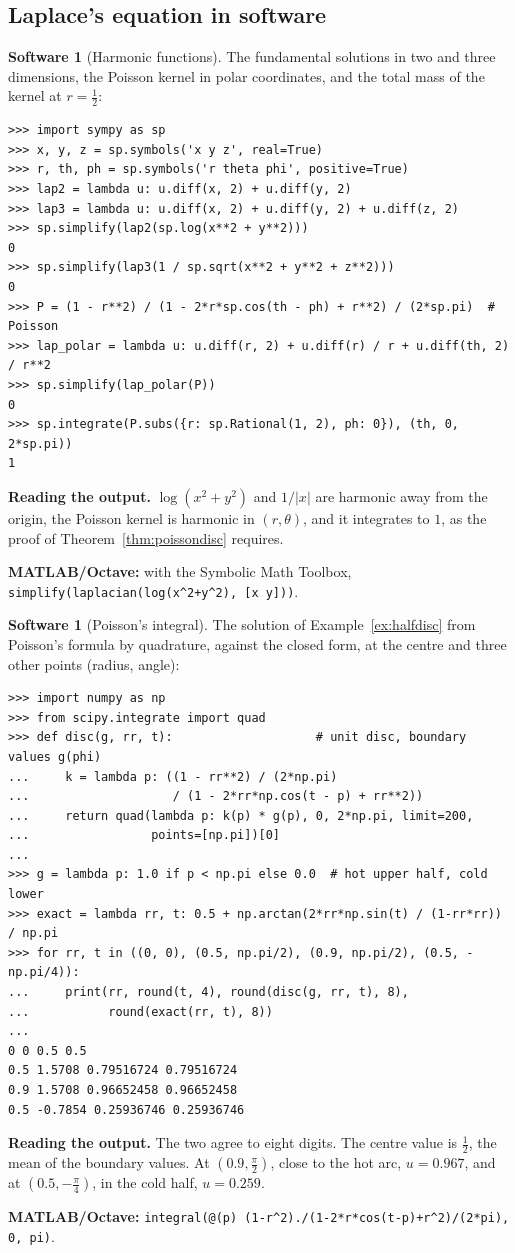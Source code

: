 \documentclass[11pt,a4paper]{article}
\numberwithin{equation}{section}
\theoremstyle{definition}
\newtheorem{software}[thm]{Software}
\begin{document}
\subsection{Laplace's equation in software}
\label{ssec:software8}

\begin{software}[Harmonic functions]
\label{sw:harmonic}
The fundamental solutions in two and three dimensions, the Poisson kernel in polar coordinates, and the total mass of the kernel at $r = \frac12$:
{\small\begin{verbatim}
>>> import sympy as sp
>>> x, y, z = sp.symbols('x y z', real=True)
>>> r, th, ph = sp.symbols('r theta phi', positive=True)
>>> lap2 = lambda u: u.diff(x, 2) + u.diff(y, 2)
>>> lap3 = lambda u: u.diff(x, 2) + u.diff(y, 2) + u.diff(z, 2)
>>> sp.simplify(lap2(sp.log(x**2 + y**2)))
0
>>> sp.simplify(lap3(1 / sp.sqrt(x**2 + y**2 + z**2)))
0
>>> P = (1 - r**2) / (1 - 2*r*sp.cos(th - ph) + r**2) / (2*sp.pi)  # Poisson
>>> lap_polar = lambda u: u.diff(r, 2) + u.diff(r) / r + u.diff(th, 2) / r**2
>>> sp.simplify(lap_polar(P))
0
>>> sp.integrate(P.subs({r: sp.Rational(1, 2), ph: 0}), (th, 0, 2*sp.pi))
1
\end{verbatim}}
\textbf{Reading the output.} $\log(x^2 + y^2)$ and $1/|x|$ are harmonic away from the origin, the Poisson kernel is harmonic in $(r, \theta)$, and it integrates to $1$, as the proof of Theorem~\ref{thm:poissondisc} requires.

\textbf{MATLAB/Octave:} with the Symbolic Math Toolbox, \texttt{simplify(laplacian(log(x\^{}2+y\^{}2), [x y]))}.
\end{software}

\begin{software}[Poisson's integral]
\label{sw:poissondisc}
The solution of Example~\ref{ex:halfdisc} from Poisson's formula by quadrature, against the closed form, at the centre and three other points (radius, angle):
{\small\begin{verbatim}
>>> import numpy as np
>>> from scipy.integrate import quad
>>> def disc(g, rr, t):                    # unit disc, boundary values g(phi)
...     k = lambda p: ((1 - rr**2) / (2*np.pi)
...                    / (1 - 2*rr*np.cos(t - p) + rr**2))
...     return quad(lambda p: k(p) * g(p), 0, 2*np.pi, limit=200,
...                 points=[np.pi])[0]
...
>>> g = lambda p: 1.0 if p < np.pi else 0.0  # hot upper half, cold lower
>>> exact = lambda rr, t: 0.5 + np.arctan(2*rr*np.sin(t) / (1-rr*rr)) / np.pi
>>> for rr, t in ((0, 0), (0.5, np.pi/2), (0.9, np.pi/2), (0.5, -np.pi/4)):
...     print(rr, round(t, 4), round(disc(g, rr, t), 8),
...           round(exact(rr, t), 8))
...
0 0 0.5 0.5
0.5 1.5708 0.79516724 0.79516724
0.9 1.5708 0.96652458 0.96652458
0.5 -0.7854 0.25936746 0.25936746
\end{verbatim}}
\textbf{Reading the output.} The two agree to eight digits. The centre value is $\frac12$, the mean of the boundary values. At $(0.9, \frac\pi2)$, close to the hot arc, $u = 0.967$, and at $(0.5, -\frac\pi4)$, in the cold half, $u = 0.259$.

\textbf{MATLAB/Octave:} \texttt{integral(@(p) (1-r\^{}2)./(1-2*r*cos(t-p)+r\^{}2)/(2*pi), 0, pi)}.
\end{software}
\end{document}
